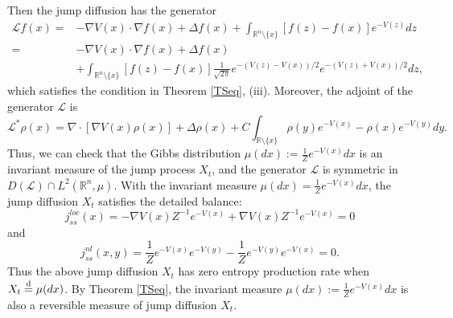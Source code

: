\documentclass[10pt]{article}
\theoremstyle{definition}
\theoremstyle{remark}
\numberwithin{equation}{section}
\begin{document}
Then the jump diffusion has the generator
\begin{align*}
    \mathcal{L}f(x) = & -\nabla V(x) \cdot\nabla f(x) + \Delta f(x) + \int_{\mathbb{R}^n \setminus \{ x \} } \left[ f(z) - f(x)\right] e^{-V(z)}dz \\
    = & -\nabla V(x)\cdot\nabla f(x) + \Delta f(x) \\
    & + \int_{\mathbb{R}^n \setminus \{ x \} } \left[ f(z) - f(x)\right] \frac{1}{\sqrt{2\pi}} e^{-(V(z) - V(x))/2} e^{-(V(z) + V(x))/2} dz,
\end{align*}
which satisfies the condition in Theorem \ref{TSeq}, (iii).
Moreover, the adjoint of the generator $\mathcal{L}$ is
\begin{equation*}
    \mathcal{L}^{\ast}\rho(x) = \nabla\cdot[\nabla V(x) \rho(x)] + \Delta\rho(x) + C \int_{\mathbb{R}\setminus\{x\}} \rho(y) e^{-V(x)} - \rho(x) e^{-V(y)} dy.
\end{equation*}
Thus, we can check that the Gibbs distribution $\mu(dx):= \frac{1}{Z} e^{-V(x)}dx$ is an invariant measure of the jump process $X_t$, and the generator $\mathcal{L}$ is symmetric in $D(\mathcal{L}) \cap L^2(\mathbb{R}^n, \mu)$. With the invariant measure $\mu(dx) = \frac{1}{Z}e^{-V(x)}dx$, the jump diffusion $X_t$ satisfies the detailed balance:
\begin{equation*}
    j^{loc}_{ss}(x)= -\nabla V(x) Z^{-1}e^{-V(x)} +  \nabla V(x) Z^{-1}e^{-V(x)}= 0
\end{equation*}
and
\begin{equation*}
    j^{nl}_{ss}(x,y) = \frac{1}{Z}e^{-V(x)}e^{- V(y)} - \frac{1}{Z}e^{-V(y)}e^{-V(x)} = 0.
\end{equation*}
Thus the above jump diffusion $X_t$ has zero entropy production rate when $X_t \overset{\text d}{=} \mu(dx)$.
By Theorem \ref{TSeq}, the invariant measure $\mu(dx):= \frac{1}{Z} e^{-V(x)}dx$ is also a reversible measure of jump diffusion $X_t$. 
\end{document}
